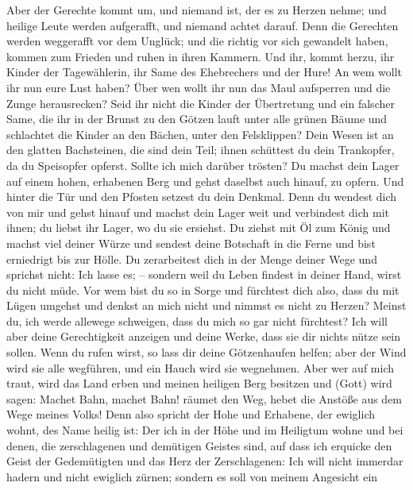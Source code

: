  Aber der Gerechte kommt um, und niemand ist, der es zu
Herzen nehme; und heilige Leute werden aufgerafft, und niemand achtet
darauf. Denn die Gerechten werden weggerafft vor dem Unglück;
 und die richtig vor sich gewandelt haben, kommen zum
Frieden und ruhen in ihren Kammern.  Und ihr, kommt herzu,
ihr Kinder der Tagewählerin, ihr Same des Ehebrechers und der Hure!
 An wem wollt ihr nun eure Lust haben? Über wen wollt ihr
nun das Maul aufsperren und die Zunge herausrecken? Seid ihr nicht die
Kinder der Übertretung und ein falscher Same,  die ihr in
der Brunst zu den Götzen lauft unter alle grünen Bäume und schlachtet
die Kinder an den Bächen, unter den Felsklippen?  Dein
Wesen ist an den glatten Bachsteinen, die sind dein Teil; ihnen
schüttest du dein Trankopfer, da du Speisopfer opferst. Sollte ich mich
darüber trösten?  Du machst dein Lager auf einem hohen,
erhabenen Berg und gehst daselbst auch hinauf, zu opfern. 
Und hinter die Tür und den Pfosten setzest du dein Denkmal. Denn du
wendest dich von mir und gehst hinauf und machst dein Lager weit und
verbindest dich mit ihnen; du liebst ihr Lager, wo du sie ersiehst.
 Du ziehst mit Öl zum König und machst viel deiner Würze
und sendest deine Botschaft in die Ferne und bist erniedrigt bis zur
Hölle.  Du zerarbeitest dich in der Menge deiner Wege und
sprichst nicht: Ich lasse es; -- sondern weil du Leben findest in deiner
Hand, wirst du nicht müde.  Vor wem bist du so in Sorge
und fürchtest dich also, dass du mit Lügen umgehst und denkst an mich
nicht und nimmst es nicht zu Herzen? Meinst du, ich werde allewege
schweigen, dass du mich so gar nicht fürchtest?  Ich will
aber deine Gerechtigkeit anzeigen und deine Werke, dass sie dir nichts
nütze sein sollen.  Wenn du rufen wirst, so lass dir
deine Götzenhaufen helfen; aber der Wind wird sie alle wegführen, und
ein Hauch wird sie wegnehmen. Aber wer auf mich traut, wird das Land
erben und meinen heiligen Berg besitzen  und (Gott) wird
sagen: Machet Bahn, machet Bahn! räumet den Weg, hebet die Anstöße aus
dem Wege meines Volks!  Denn also spricht der Hohe und
Erhabene, der ewiglich wohnt, des Name heilig ist: Der ich in der Höhe
und im Heiligtum wohne und bei denen, die zerschlagenen und demütigen
Geistes sind, auf dass ich erquicke den Geist der Gedemütigten und das
Herz der Zerschlagenen:  Ich will nicht immerdar hadern
und nicht ewiglich zürnen; sondern es soll von meinem Angesicht ein
